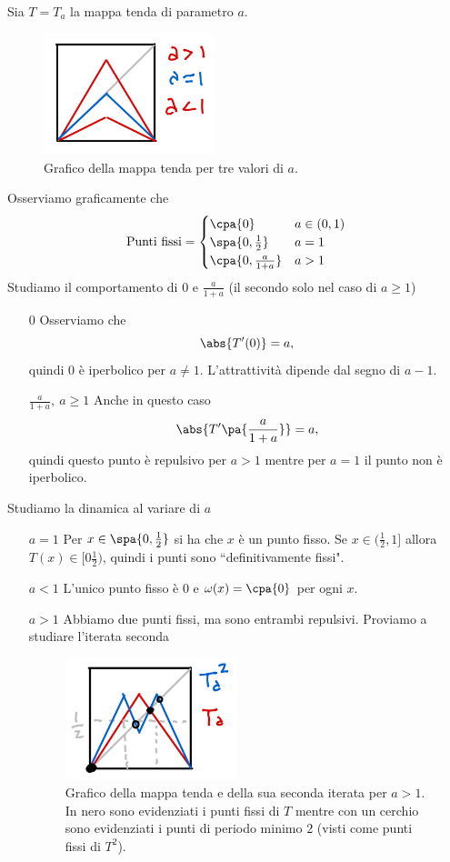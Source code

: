 \begin{example}
Sia $T=T_a$ la mappa tenda di parametro $a$. 
\begin{figure}[!htb]
    \centering
    \includegraphics[width=5cm]{Immagini/Tipi_mappa_tenda.png}
    \caption{Grafico della mappa tenda per tre valori di $a$.}
\end{figure}

\noindent
Osserviamo graficamente che 
\[\text{Punti fissi}=\begin{cases}
\cpa{0} &a\in (0,1)\\
\spa{0,\frac12} &a=1\\
\cpa{0,\frac a{1+a}} &a>1
\end{cases}\]
Studiamo il comportamento di $0$ e $\frac a{1+a}$ (il secondo solo nel caso di $a\geq 1$)
\setlength{\leftmargini}{0cm}
\begin{itemize}
\item[$\boxed{0}$] Osserviamo che
\[\abs{T'(0)}=a,\]
quindi $0$ \`e iperbolico per $a\neq 1$. L'attrattivit\`a dipende dal segno di $a-1$.
\item[$\boxed{\frac a{1+a},\ a\geq 1}$] Anche in questo caso
\[\abs{T'\pa{\frac a{1+a}}}=a,\]
quindi questo punto \`e repulsivo per $a>1$ mentre per $a=1$ il punto non \`e iperbolico.
\end{itemize}
\setlength{\leftmargini}{0.5cm}
Studiamo la dinamica al variare di $a$
\setlength{\leftmargini}{0cm}
\begin{itemize}
\item[$\boxed{a=1}$] Per $x\in \spa{0,\frac12}$ si ha che $x$ \`e un punto fisso. Se $x\in (\frac12,1]$ allora $T(x)\in [0\frac12)$, quindi i punti sono ``definitivamente fissi".
\item[$\boxed{a<1}$] L'unico punto fisso \`e $0$ e $\omega(x)=\cpa{0}$ per ogni $x$.
\item[$\boxed{a>1}$] Abbiamo due punti fissi, ma sono entrambi repulsivi. Proviamo a studiare l'iterata seconda
\begin{figure}[!htb]
    \centering
    \includegraphics[width=5cm]{Immagini/mappa_tenda_iterata.png}
    \caption{Grafico della mappa tenda e della sua seconda iterata per $a>1$. In nero sono evidenziati i punti fissi di $T$ mentre con un cerchio sono evidenziati i punti di periodo minimo $2$ (visti come punti fissi di $T^2$).}
\end{figure}


\end{itemize}
\end{example}
